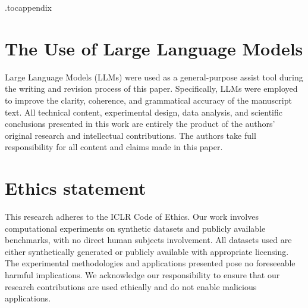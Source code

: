 \documentclass{article} %
\begin{document}






\appendix
\onecolumn

\etocdepthtag.toc{appendix}


{
  \renewcommand{\contentsname}{Appendix Contents}%
  \setcounter{tocdepth}{2}
  \tableofcontents
} %
\newpage



\section{The Use of Large Language Models}

Large Language Models (LLMs) were used as a general-purpose assist tool during the writing and revision process of this paper. Specifically, LLMs were employed to improve the clarity, coherence, and grammatical accuracy of the manuscript text. All technical content, experimental design, data analysis, and scientific conclusions presented in this work are entirely the product of the authors' original research and intellectual contributions. The authors take full responsibility for all content and claims made in this paper.


\section{Ethics statement}
This research adheres to the ICLR Code of Ethics. Our work involves computational experiments on synthetic datasets and publicly available benchmarks, with no direct human subjects involvement. All datasets used are either synthetically generated or publicly available with appropriate licensing. The experimental methodologies and applications presented pose no foreseeable harmful implications. We acknowledge our responsibility to ensure that our research contributions are used ethically and do not enable malicious applications.
\end{document}
